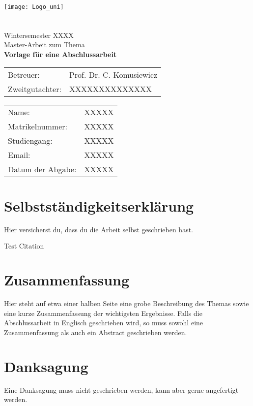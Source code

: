 \documentclass[12pt,a4paper]{article}
\begin{document}
\begin{titlepage}
\begin{center}
\texttt{[image: Logo\_uni]} \\[5pt]
{\large{}}  \\[5pt]
{\large{}}   \\[10pt]
{\large Wintersemester XXXX} \\[1cm]
{\large{Master-Arbeit zum Thema}} \\[10pt]
	{\Large\textbf{Vorlage für eine Abschlussarbeit}}\\[1cm]
\begin{tabular}[l]{ll}
{\large Betreuer:} & {\large Prof. Dr. C. Komusiewicz}\\
{\large Zweitgutachter:} & {\large XXXXXXXXXXXXXX}
\end{tabular}
\end{center}

	
\vfill
\begin{tabular}[l]{ll}
Name:           & XXXXX\\
Matrikelnummer: & XXXXX\\
Studiengang:    & XXXXX\\
Email: & XXXXX\\
Datum der Abgabe: & XXXXX \\
\end{tabular}
\end{titlepage}

\section*{Selbstständigkeitserklärung}
Hier versicherst du, dass du die Arbeit selbst geschrieben hast.

Test Citation \cite{agrawal2022parameter}

\section*{Zusammenfassung}
Hier steht auf etwa einer halben Seite eine grobe Beschreibung des Themas sowie eine kurze Zusammenfassung der wichtigsten Ergebnisse. 
Falls die Abschlussarbeit in Englisch geschrieben wird, so muss sowohl eine Zusammenfassung als auch ein Abstract geschrieben werden.

\section*{Danksagung}
Eine Danksagung muss nicht geschrieben werden, kann aber gerne angefertigt werden.
\end{document}

